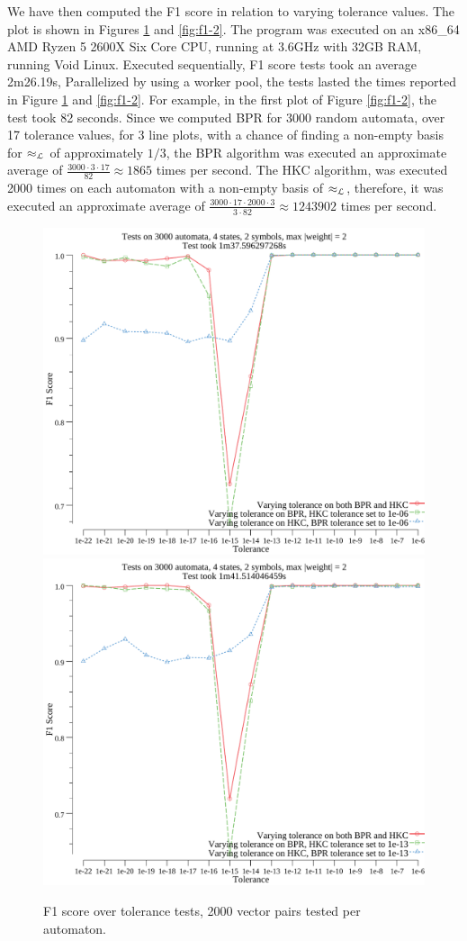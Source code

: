 We have then computed 
the F1 score in relation to varying tolerance values.
The plot is shown in Figures \ref{fig:f1} and \ref{fig:f1-2}.  
The program was executed on an x86\_64 AMD Ryzen 5 2600X Six Core CPU, running at 3.6GHz with 32GB RAM, 
running Void Linux. Executed sequentially, F1 score tests took an average 2m26.19s,
Parallelized by using a worker pool, the tests lasted the times reported in 
Figure \ref{fig:f1} and \ref{fig:f1-2}.
For example, in the first plot of Figure \ref{fig:f1-2}, the test took 82 seconds.
Since we computed BPR for 3000 random automata, over 17 tolerance values, for 3 line plots,
with a chance of finding a non-empty basis for $\approx_{\mathcal{L}}$ of approximately $1/3$,
the BPR algorithm was executed an approximate average of
$\frac{3000 \cdot 3 \cdot 17}{82} \approx 1865$ times per second. 
The HKC algorithm, was executed 2000 times on each automaton with a non-empty 
basis of $\approx_{\mathcal{L}}$, therefore, it was executed an approximate average of 
$\frac{3000 \cdot 17 \cdot 2000 \cdot 3}{3 \cdot 82} \approx 1243902$ times per second.


\begin{figure}[htbp!]
    \centering
    \includegraphics[width=.75\textwidth]{./plots/f1-tol-1e-06.pdf}
    \includegraphics[width=.75\textwidth]{./plots/f1-tol-1e-13.pdf}
    \caption{F1 score over tolerance tests, 2000 vector pairs tested per automaton.}
    \label{fig:f1}
\end{figure}

